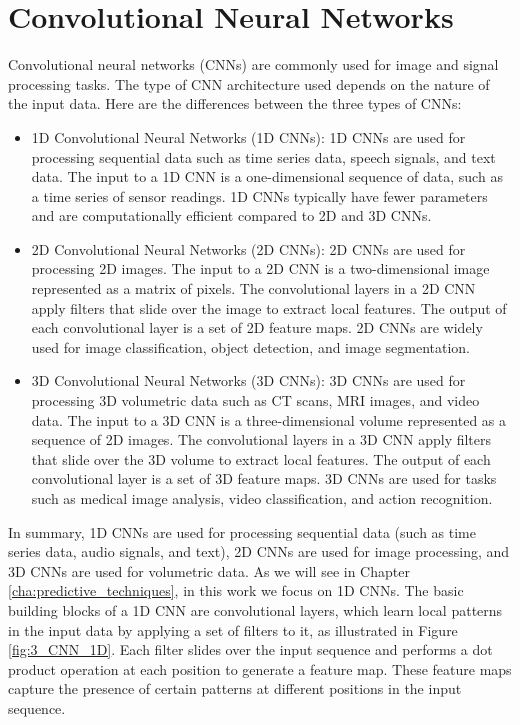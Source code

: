 \section{Convolutional Neural Networks}
\label{sec:3_cnns}



Convolutional neural networks (CNNs) are commonly used for image and signal processing tasks. The type of CNN architecture used depends on the nature of the input data. Here are the differences between the three types of CNNs:

\begin{itemize}
	\item 1D Convolutional Neural Networks (1D CNNs): 1D CNNs are used for processing sequential data such as time series data, speech signals, and text data. The input to a 1D CNN is a one-dimensional sequence of data, such as a time series of sensor readings. 1D CNNs typically have fewer parameters and are computationally efficient compared to 2D and 3D CNNs.
	
	\item 2D Convolutional Neural Networks (2D CNNs): 2D CNNs are used for processing 2D images. The input to a 2D CNN is a two-dimensional image represented as a matrix of pixels. The convolutional layers in a 2D CNN apply filters that slide over the image to extract local features. The output of each convolutional layer is a set of 2D feature maps. 2D CNNs are widely used for image classification, object detection, and image segmentation.
	
	\item 3D Convolutional Neural Networks (3D CNNs): 3D CNNs are used for processing 3D volumetric data such as CT scans, MRI images, and video data. The input to a 3D CNN is a three-dimensional volume represented as a sequence of 2D images. The convolutional layers in a 3D CNN apply filters that slide over the 3D volume to extract local features. The output of each convolutional layer is a set of 3D feature maps. 3D CNNs are used for tasks such as medical image analysis, video classification, and action recognition.
\end{itemize}

In summary, 1D CNNs are used for processing sequential data (such as time series data, audio signals, and text), 2D CNNs are used for image processing, and 3D CNNs are used for volumetric data. As we will see in Chapter \ref{cha:predictive_techniques}, in this work we focus on 1D CNNs. The basic building blocks of a 1D CNN are convolutional layers, which learn local patterns in the input data by applying a set of filters to it, as illustrated in Figure \ref{fig:3_CNN_1D}. Each filter slides over the input sequence and performs a dot product operation at each position to generate a feature map. These feature maps capture the presence of certain patterns at different positions in the input sequence. 
 
